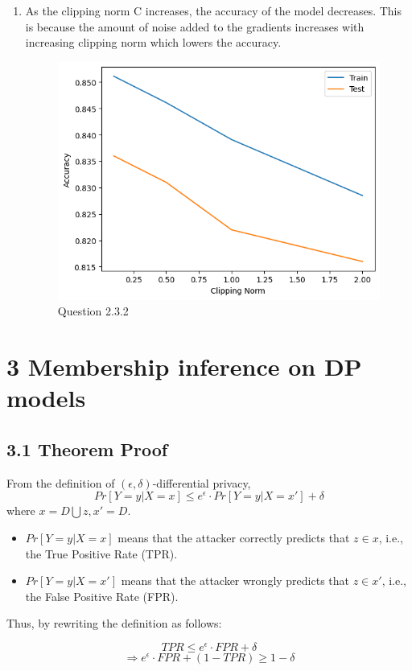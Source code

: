 \begin{enumerate}
    \item As the clipping norm C increases, the accuracy of the model decreases. This is because the amount of noise added to the gradients increases with increasing clipping norm which lowers the accuracy.

    \begin{figure}[h]
        \centering
        \includegraphics[width=0.5\linewidth]{report/images/quest2-3-2.png}
        \caption{Question 2.3.2}
        \label{fig:enter-label}
    \end{figure}
    
\end{enumerate}

\section*{3 Membership inference on DP models}

\subsection*{3.1 Theorem Proof}

From the definition of $(\epsilon, \delta)$-differential privacy, 
$$ Pr[Y=y | X=x] \leq e^\epsilon \cdot Pr[Y=y|X=x'] + \delta $$
where $ x = D \bigcup z, x' = D $.

\begin{itemize}
    \item $Pr[Y=y | X=x]$ means that the attacker correctly predicts that $z \in x$, i.e., the True Positive Rate (TPR).

    \item $Pr[Y = y|X = x']$ means that the attacker wrongly predicts that $z \in x'$, i.e., the False Positive Rate (FPR).
\end{itemize}

Thus, by rewriting the definition as follows:

$$ TPR \leq e^\epsilon \cdot FPR + \delta $$
$$ \Rightarrow e^\epsilon \cdot FPR + (1 - TPR) \geq 1 - \delta  $$

